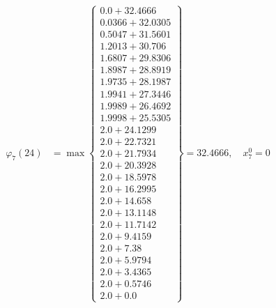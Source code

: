 \documentclass{article}
\begin{document}
\begin{align*}
  
\varphi_{7}(24) &= \max \left\{ \begin{array}{c}
0.0 + 32.4666 \\
 0.0366 + 32.0305 \\
 0.5047 + 31.5601 \\
 1.2013 + 30.706 \\
 1.6807 + 29.8306 \\
 1.8987 + 28.8919 \\
 1.9735 + 28.1987 \\
 1.9941 + 27.3446 \\
 1.9989 + 26.4692 \\
 1.9998 + 25.5305 \\
 2.0 + 24.1299 \\
 2.0 + 22.7321 \\
 2.0 + 21.7934 \\
 2.0 + 20.3928 \\
 2.0 + 18.5978 \\
 2.0 + 16.2995 \\
 2.0 + 14.658 \\
 2.0 + 13.1148 \\
 2.0 + 11.7142 \\
 2.0 + 9.4159 \\
 2.0 + 7.38 \\
 2.0 + 5.9794 \\
 2.0 + 3.4365 \\
 2.0 + 0.5746 \\
 2.0 + 0.0
\end{array} \right\}=32.4666,\quad x_{7}^0=0\\
  
  
  

\end{align*}
\end{document}
